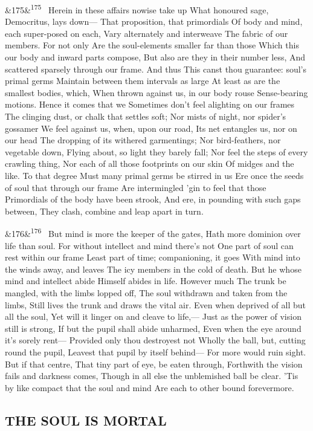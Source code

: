 \documentclass[12pt]{article}
\newcommand{\para}[1][]{\par\noindent\ifx&#1&\else\textsuperscript{\footnotesize #1}~\fi}
\begin{document}
\para[175] Herein in these affairs nowise take up What honoured sage, Democritus, lays down--- That proposition, that primordials Of body and mind, each super-posed on each, Vary alternately and interweave The fabric of our members. For not only Are the soul-elements smaller far than those Which this our body and inward parts compose, But also are they in their number less, And scattered sparsely through our frame. And thus This canst thou guarantee: soul's primal germs Maintain between them intervals as large At least as are the smallest bodies, which, When thrown against us, in our body rouse Sense-bearing motions. Hence it comes that we Sometimes don't feel alighting on our frames The clinging dust, or chalk that settles soft; Nor mists of night, nor spider's gossamer We feel against us, when, upon our road, Its net entangles us, nor on our head The dropping of its withered garmentings; Nor bird-feathers, nor vegetable down, Flying about, so light they barely fall; Nor feel the steps of every crawling thing, Nor each of all those footprints on our skin Of midges and the like. To that degree Must many primal germs be stirred in us Ere once the seeds of soul that through our frame Are intermingled 'gin to feel that those Primordials of the body have been strook, And ere, in pounding with such gaps between, They clash, combine and leap apart in turn.

\para[176] But mind is more the keeper of the gates, Hath more dominion over life than soul. For without intellect and mind there's not One part of soul can rest within our frame Least part of time; companioning, it goes With mind into the winds away, and leaves The icy members in the cold of death. But he whose mind and intellect abide Himself abides in life. However much The trunk be mangled, with the limbs lopped off, The soul withdrawn and taken from the limbs, Still lives the trunk and draws the vital air. Even when deprived of all but all the soul, Yet will it linger on and cleave to life,--- Just as the power of vision still is strong, If but the pupil shall abide unharmed, Even when the eye around it's sorely rent--- Provided only thou destroyest not Wholly the ball, but, cutting round the pupil, Leavest that pupil by itself behind--- For more would ruin sight. But if that centre, That tiny part of eye, be eaten through, Forthwith the vision fails and darkness comes, Though in all else the unblemished ball be clear. 'Tis by like compact that the soul and mind Are each to other bound forevermore.

\subsection*{THE SOUL IS MORTAL}
\end{document}
